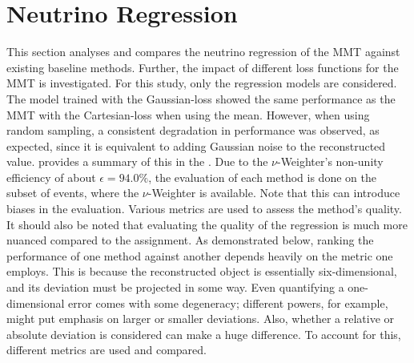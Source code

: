 \section{Neutrino Regression}
\label{sec:evaluation:regression}
This section analyses and compares the neutrino regression of the MMT against existing baseline methods.
Further, the impact of different loss functions for the MMT is investigated. For this study, only the regression models are considered. The model trained with the Gaussian-loss showed the same performance as the MMT with the Cartesian-loss when using the mean. However, when using random sampling, a consistent degradation in performance was observed, as expected, since it is equivalent to adding Gaussian noise to the reconstructed value.  provides a summary of this in the .
Due to the $\nu$-Weighter's non-unity efficiency of about $\epsilon=94.0\%$, the evaluation of each method is done on the subset of events, where the $\nu$-Weighter is available. Note that this can introduce biases in the evaluation.
Various metrics are used to assess the method's quality. It should also be noted that evaluating the quality of the regression is much more nuanced compared to the assignment. As demonstrated below, ranking the performance of one method against another depends heavily on the metric one employs. This is because the reconstructed object is essentially six-dimensional, and its deviation must be projected in some way. Even quantifying a one-dimensional error comes with some degeneracy; different powers, for example, might put emphasis on larger or smaller deviations. Also, whether a relative or absolute deviation is considered can make a huge difference.
To account for this, different metrics are used and compared.
\begin{table}[ht]
    \centering
    \caption{Summary of the  MAE of the different neutrino regression methods for the Cartesian coordinates of the neutrinos in the lab frame. For the MMT, the loss function used during training is shown in brackets. The uncertainties represent the statistical variation in the dataset.}
    
    \label{tab:mae:cartesian}
\end{table}

